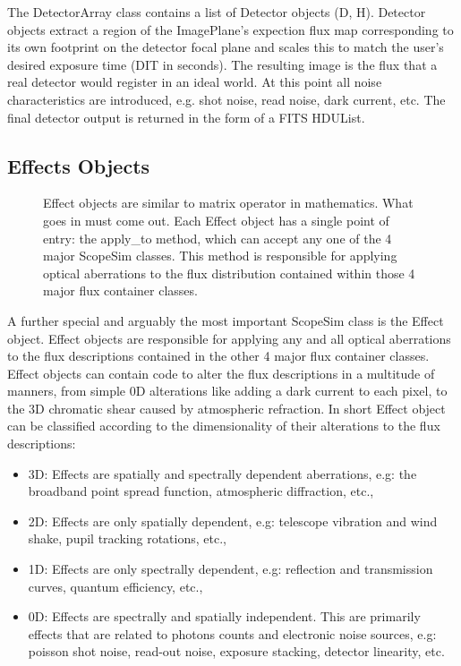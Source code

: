 The DetectorArray class contains a list of Detector objects (D, H).
Detector objects extract a region of the ImagePlane's expection flux map corresponding to its own footprint on the detector focal plane and scales this to match the user's desired exposure time (DIT in seconds).
The resulting image is the flux that a real detector would register in an ideal world.
At this point all noise characteristics are introduced, e.g. shot noise, read noise, dark current, etc.
The final detector output is returned in the form of a FITS HDUList.


\subsection{Effects Objects%
  \label{effects-objects}%
}

\begin{figure}
\noindent{}\label{fig-effect}

\caption{Effect objects are similar to matrix operator in mathematics.
What goes in must come out.
Each Effect object has a single point of entry: the \textquotedbl{}apply\_to\textquotedbl{} method, which can accept any one of the 4 major ScopeSim classes.
This method is responsible for applying optical aberrations to the flux distribution contained within those 4 major flux container classes.}
\end{figure}

A further special and arguably the most important ScopeSim class is the Effect object.
Effect objects are responsible for applying any and all optical aberrations to the flux descriptions contained in the other 4 major flux container classes.
Effect objects can contain code to alter the flux descriptions in a multitude of manners, from simple 0D alterations like adding a dark current to each pixel, to the 3D chromatic shear caused by atmospheric refraction.
In short Effect object can be classified according to the dimensionality of their alterations to the flux descriptions:

\begin{itemize}
\item 3D: Effects are spatially and spectrally dependent aberrations, e.g: the broadband point spread function, atmospheric diffraction, etc.,

\item 2D: Effects are only spatially dependent, e.g: telescope vibration and wind shake, pupil tracking rotations, etc.,

\item 1D: Effects are only spectrally dependent, e.g: reflection and transmission curves, quantum efficiency, etc.,

\item 0D: Effects are spectrally and spatially independent. This are primarily effects that are related to photons counts and electronic noise sources, e.g: poisson shot noise, read-out noise, exposure stacking, detector linearity, etc.
\end{itemize}

